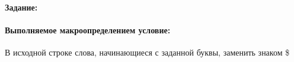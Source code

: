 \paragraph{Задание:}

\paragraph{Выполняемое макроопределением условие:}
В исходной строке слова, начинающиеся с заданной буквы, заменить знаком \$



